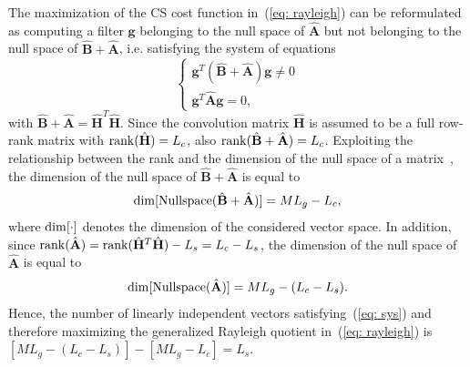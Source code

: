 \documentclass[draftcls,onecolumn,11pt]{IEEEtran}
\begin{document}
The maximization of the CS cost function in~(\ref{eq: rayleigh}) can be reformulated as computing a filter $\mathbf{g}$ belonging to the null space of $\hat{\mathbf{A}}$ but not belonging to the null space of $\hat{\mathbf{B}} + \hat{\mathbf{A}}$, i.e. satisfying the system of equations
\begin{equation}
\label{eq: sys}
\begin{cases}
\mathbf{g}^T (\hat{\mathbf{B}} + \hat{\mathbf{A}})\mathbf{g} \neq 0 \\
\mathbf{g}^T\hat{\mathbf{A}} \mathbf{g} = 0,
\end{cases}
\end{equation}
 with $\hat{\mathbf{B}} + \hat{\mathbf{A}} = \hat{\mathbf{H}}^T\hat{\mathbf{H}}$.
Since the convolution matrix $\hat{\mathbf{H}}$ is assumed to be a full row-rank matrix with ${\rm rank}(\hat{\mathbf{H}}) = L_c$, also ${\rm rank}(\hat{\mathbf{B}} + \hat{\mathbf{A}}) = L_c$.
Exploiting the relationship between the rank and the dimension of the null space of a matrix~\cite{Golub_Matrix_book}, the dimension of the null space of $\hat{\mathbf{B}} + \hat{\mathbf{A}}$ is equal to
\begin{eqnarray}
{\rm dim}[{\rm Nullspace} (\hat{\mathbf{B}} + \hat{\mathbf{A}})] = ML_g - L_c,
\end{eqnarray}
where $\rm{dim}[ \cdot]$ denotes the dimension of the considered vector space.
In addition, since ${\rm rank}(\hat{\mathbf{A}}) = {\rm rank}(\hat{\mathbf{H}}^T \hat{\mathbf{H}}) - L_s = L_c - L_s$, the dimension of the null space of $\hat{\mathbf{A}}$ is equal to
\begin{eqnarray}
{\rm dim}[{\rm Nullspace} (\hat{\mathbf{A}})] = ML_g - (L_c - L_s).
\end{eqnarray}
Hence, the number of linearly independent vectors satisfying~(\ref{eq: sys}) and therefore maximizing the generalized Rayleigh quotient in~(\ref{eq: rayleigh}) is $[ML_g-(L_c-L_s)] - [ML_g-L_c] = L_s$.
\end{document}
